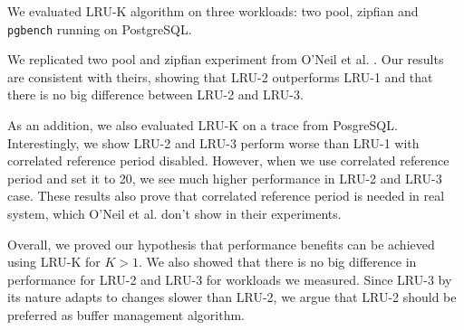 We evaluated LRU-K algorithm on three workloads: two pool, zipfian and \texttt{pgbench} running on PostgreSQL. 

We replicated two pool and zipfian experiment from O'Neil et al. \cite{lruk}. Our results are consistent with theirs, showing that LRU-2 outperforms LRU-1 and that there is no big difference between LRU-2 and LRU-3.

As an addition, we also evaluated LRU-K on a trace from PosgreSQL. Interestingly, we show LRU-2 and LRU-3 perform worse than LRU-1 with correlated reference period disabled. However, when we use correlated reference period and set it to 20, we see much higher performance in LRU-2 and LRU-3 case. These results also prove that correlated reference period is needed in real system, which O'Neil et al. \cite{lruk} don't show in their experiments.

Overall, we proved our hypothesis that performance benefits can be achieved using LRU-K for $K > 1$. We also showed that there is no big difference in performance for LRU-2 and LRU-3 for workloads we measured. Since LRU-3 by its nature adapts to changes slower than LRU-2, we argue that LRU-2 should be preferred as buffer management algorithm.